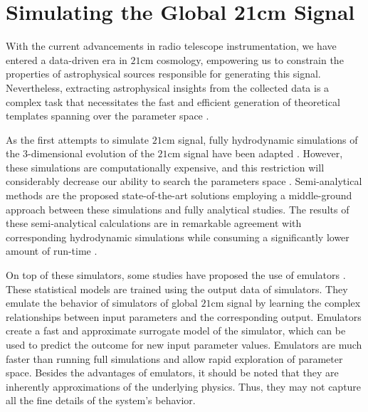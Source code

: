 \documentclass[12pt, TexShade, letterpaper]{report}
\begin{document}
\section{Simulating the Global 21cm Signal}
With the current advancements in radio telescope instrumentation, we have entered a data-driven era in $\mathrm{21cm}$ cosmology, empowering us to constrain the properties of astrophysical sources responsible for generating this signal. Nevertheless, extracting astrophysical insights from the collected data is a complex task that necessitates the fast and efficient generation of theoretical templates spanning over the parameter space \cite{emulate_21cm}. \par
As the first attempts to simulate $\mathrm{21cm}$ signal, fully hydrodynamic simulations of the 3-dimensional evolution of the $\mathrm{21cm}$ signal have been adapted \cite{hydrodynamic_sim}. However, these simulations are computationally expensive, and this restriction will considerably decrease our ability to search the parameters space \cite{ares2014jordan}. 
Semi-analytical methods are the proposed state-of-the-art solutions employing a middle-ground approach between these simulations and fully analytical studies. The results of these semi-analytical calculations are in remarkable agreement with corresponding hydrodynamic simulations while consuming a significantly lower amount of run-time \cite{semi_analytic_1, semi_analytic_2, semi_analytic_3, semi_analytic_4, semi-analytic_5}. \par
On top of these simulators, some studies have proposed the use of emulators \cite{emulate_21cm, emulate_21cm_2, emulate_21cm_3}. These statistical models are trained using the output data of simulators. They emulate the behavior of simulators of global $\mathrm{21cm}$ signal by learning the complex relationships between input parameters and the corresponding output. Emulators create a fast and approximate surrogate model of the simulator, which can be used to predict the outcome for new input parameter values. Emulators are much faster than running full simulations and allow rapid exploration of parameter space. Besides the advantages of emulators, it should be noted that they are inherently approximations of the underlying physics. Thus, they may not capture all the fine details of the system's behavior.\par
\end{document}
